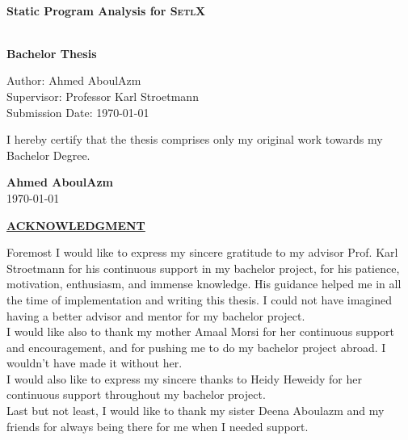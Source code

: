 \documentclass[11pt]{report}
\begin{document}
\begin{center}
\vspace{2cm}
\\
\begin{huge}
\textbf{Static Program Analysis for \textsc{SetlX}}
\end{huge}
\\[2cm]
\textbf{Bachelor Thesis}
\begin{tabbing}\hspace{5cm}
Author: Ahmed AboulAzm\\\hspace{5cm}
Supervisor: Professor Karl Stroetmann\\\hspace{5cm}
Submission Date: {\today}
\end{tabbing}
\end{center}
\vspace{1.5cm}
I hereby certify that the thesis comprises only my original work towards my Bachelor Degree.
\begin{flushright}
\textbf{Ahmed AboulAzm}\\
\today
\end{flushright}

\pagebreak

\begin{center}
\begin{Large}
\underline{\textbf{ACKNOWLEDGMENT}}
\end{Large}
\end{center}

\vspace{2cm}

\begin{Large}
Foremost I would like to express my sincere gratitude to my advisor Prof. Karl Stroetmann for his continuous support in my bachelor project, for his patience, motivation, enthusiasm, and immense knowledge. His guidance helped me in all the time of implementation and writing this thesis. I could not have imagined having a better advisor and mentor for my bachelor project.\\

I would like also to thank my mother Amaal Morsi for her continuous support and encouragement, and for pushing me to do my bachelor project abroad. I wouldn't have made it without her.\\

I would also like to express my sincere thanks to Heidy Heweidy for her continuous support throughout my bachelor project.\\

Last but not least, I would like to thank my sister Deena Aboulazm and my friends for always being there for me when I needed support.
\end{Large}
\end{document}
